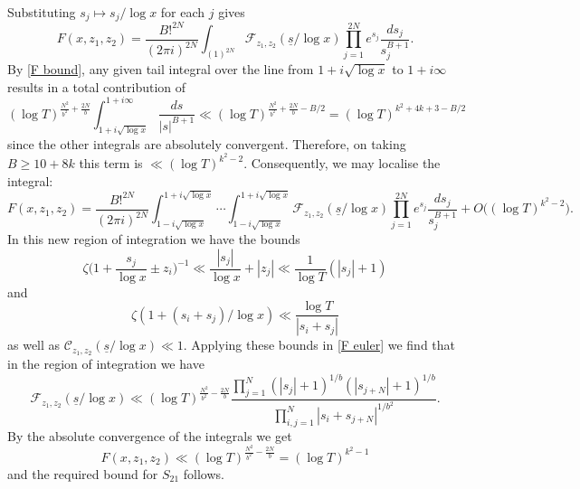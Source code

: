 \documentclass[oneside, 12pt]{amsart}
\theoremstyle{definition}
\newcommand{\mc}{\mathcal}
\newcommand{\ul}{\underline}
\newcommand{\geqs}{\geqslant }
\newcommand{\ben}{\begin{equation}}
\newcommand{\een}{\end{equation} }
\begin{document}
Substituting $s_j\mapsto s_j/\log x$ for each $j$ gives
\[
F(x,z_1,z_2) = 
\frac{B!^{2N}}{(2\pi i)^{2N}}\int_{(1)^{2N}}
\mc{F}_{z_1,z_2}(\underline{s}/\log x)
                        \prod_{j=1}^{2N}e^{s_j}\frac{ds_j}{s_j^{B+1}}.
\]
By \eqref{F bound}, any given tail integral over the line from $1+i\sqrt{\log x}$ to $1+i\infty$ results in a total contribution of 
\[
(\log T)^{\frac{N^2}{b^2}+\frac{2N}{b}}\int_{1+i\sqrt{\log x}}^{1+i\infty} \frac{ds}{|s|^{B+1}}\ll (\log T)^{\frac{N^2}{b^2}+\frac{2N}{b}-B/2}=(\log T)^{k^2+4k+3-B/2}
\]
since the other integrals are absolutely convergent.
Therefore, on taking $B\geqs 10+8k$ this term is $\ll (\log T)^{k^2-2}$. Consequently, we may localise the integral:
\[
F(x,z_1,z_2) = 
\frac{B!^{2N}}{(2\pi i)^{2N}}\int_{1-i\sqrt{\log x}}^{1+i\sqrt{\log x}}\!\!\!\!\cdots \int_{1-i\sqrt{\log x}}^{1+i\sqrt{\log x}}
\mc{F}_{z_1,z_2}(\underline{s}/\log x)
                        \prod_{j=1}^{2N}e^{s_j}\frac{ds_j}{s_j^{B+1}}+O\big((\log T)^{k^2-2}\big).
\]
In this new region of integration we have the bounds 
\ben
\label{inverse zeta bound}
\zeta\Big(1+\frac{s_j}{\log x}\pm z_i\Big)^{-1}\ll \frac{|s_j|}{\log x}+|z_j|\ll \frac{1}{\log T}(|s_j|+1)
\een
and 
\ben\label{zeta bound}
\zeta(1+(s_i+s_j)/\log x)\ll \frac{\log T}{|s_i+s_j|}
\een
as well as $\mc{C}_{z_1,z_2}(\underline{s}/\log x)\ll 1$. Applying these bounds in \eqref{F euler} we find that in the region of integration we have 
\begin{equation}
\label{mcF bound}
\mc{F}_{z_1,z_2}(\ul{s}/\log x)\ll (\log T)^{\frac{N^2}{b^2}-\frac{2N}{b}}
\frac{\prod_{j=1}^{N}(|s_j|+1)^{1/b}(|s_{j+N}|+1)^{1/b}}{\prod_{i,j=1}^N|s_i+s_{j+N}|^{1/b^2}}.
\end{equation}
By the absolute convergence of the integrals we get
\[
F(x,z_1,z_2)\ll (\log T)^{\frac{N^2}{b^2}-\frac{2N}{b}}=(\log T)^{k^2-1}
\]
and the required bound for $S_{21}$ follows.
\end{document}
